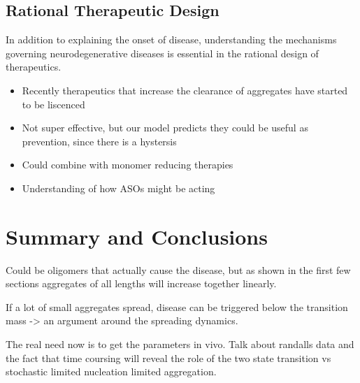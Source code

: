 \subsection{Rational Therapeutic Design}

In addition to explaining the onset of disease, understanding the mechanisms governing neurodegenerative diseases is essential in the rational design of therapeutics. 
\begin{itemize}
    \item Recently therapeutics that increase the clearance of aggregates have started to be liscenced
    \item Not super effective, but our model predicts they could be useful as prevention, since there is a hystersis
    \item Could combine with monomer reducing therapies
    \item Understanding of how ASOs might be acting
\end{itemize}


\section{Summary and Conclusions}

Could be oligomers that actually cause the disease, but as shown in the first few sections aggregates of all lengths will increase together linearly.

If a lot of small aggregates spread, disease can be triggered below the transition mass -> an argument around the spreading dynamics.

The real need now is to get the parameters in vivo. Talk about randalls data and the fact that time coursing will reveal the role of the two state transition vs stochastic limited nucleation limited aggregation.